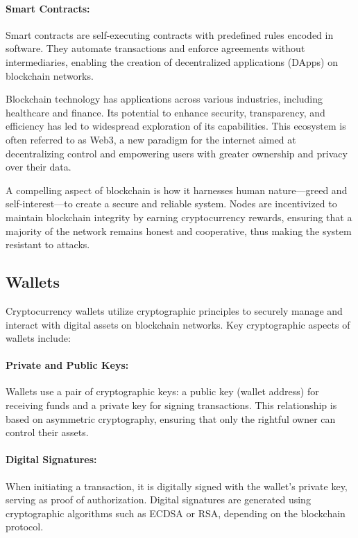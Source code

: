 \paragraph{Smart Contracts:}
Smart contracts are self-executing contracts with predefined rules encoded in
software. They automate transactions and enforce agreements without
intermediaries, enabling the creation of decentralized applications (DApps) on
blockchain networks.

Blockchain technology has applications across various industries, including
healthcare and finance. Its potential to enhance security, transparency, and
efficiency has led to widespread exploration of its capabilities. This
ecosystem is often referred to as Web3, a new paradigm for the internet aimed
at decentralizing control and empowering users with greater ownership and
privacy over their data.

A compelling aspect of blockchain is how it harnesses human nature—greed and
self-interest—to create a secure and reliable system. Nodes are incentivized to
maintain blockchain integrity by earning cryptocurrency rewards, ensuring that
a majority of the network remains honest and cooperative, thus making the
system resistant to attacks.

\subsection{Wallets}
\label{subsec:wallets}

Cryptocurrency wallets utilize cryptographic principles to securely manage and
interact with digital assets on blockchain networks. Key cryptographic aspects
of wallets include:

\paragraph{Private and Public Keys:}
Wallets use a pair of cryptographic keys: a public key (wallet address) for
receiving funds and a private key for signing transactions. This relationship
is based on asymmetric cryptography, ensuring that only the rightful owner can
control their assets.

\paragraph{Digital Signatures:}
When initiating a transaction, it is digitally signed with the wallet's private
key, serving as proof of authorization. Digital signatures are generated using
cryptographic algorithms such as ECDSA or RSA, depending on the blockchain
protocol.

